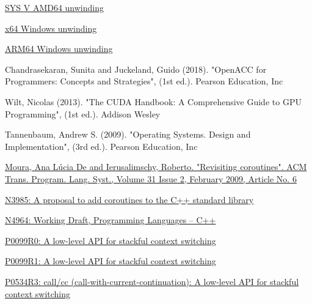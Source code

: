 \newpage
{}
\begin{thebibliography}{99}

        \href{https://software.intel.com/sites/default/files/article/402129/mpx-linux64-abi.pdf}{SYS V AMD64 unwinding}

        \href{https://docs.microsoft.com/en-us/cpp/build/exception-handling-x64?view=vs-2019}{x64 Windows unwinding}

        \href{https://docs.microsoft.com/en-us/cpp/build/arm64-exception-handling?view=vs-2019}{ARM64 Windows unwinding}

        {Chandrasekaran, Sunita and Juckeland, Guido (2018). "OpenACC for Programmers: Concepts and Strategies", (1st ed.).
         Pearson Education, Inc}

        {Wilt, Nicolas (2013). "The CUDA Handbook: A Comprehensive Guide to GPU Programming", (1st ed.).
         Addison Wesley}

        {Tannenbaum, Andrew S. (2009). "Operating Systems. Design and Implementation", (3rd ed.).
         Pearson Education, Inc}

        \href{http://www.inf.puc-rio.br/~roberto/docs/MCC15-04.pdf}
        {Moura, Ana L\'{u}cia De and Ierusalimschy, Roberto. "Revisiting coroutines".
         ACM Trans. Program. Lang. Syst., Volume 31 Issue 2, February 2009, Article No. 6}

        \href{http://isocpp.org/files/papers/n3985.pdf}
        {N3985: A proposal to add coroutines to the C++ standard library}

        \href{https://www.open-std.org/jtc1/sc22/wg21/docs/papers/2023/n4964.pdf}
        {N4964: Working Draft, Programming Languages -- C++}

        \href{http://www.open-std.org/jtc1/sc22/wg21/docs/papers/2015/p0099r0.pdf}
        {P0099R0: A low-level API for stackful context switching}

        \href{http://www.open-std.org/jtc1/sc22/wg21/docs/papers/2016/p0099r1.pdf}
        {P0099R1: A low-level API for stackful context switching}

        \href{http://www.open-std.org/jtc1/sc22/wg21/docs/papers/2017/p0534r3.pdf}
        {P0534R3: call/cc (call-with-current-continuation): A low-level API for stackful
        context switching}


\end{thebibliography}
